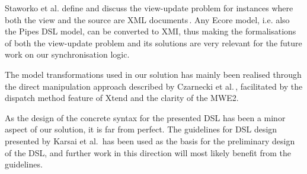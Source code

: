 Staworko et al. define and discuss the view-update problem for instances where both the view and the source are XML documents\,\cite{staworko10}. Any Ecore model, i.e. also the Pipes DSL model, can be converted to XMI, thus making the formalisations of both the view-update problem and its solutions are very relevant for the future work on our synchronisation logic.

The model transformations used in our solution has mainly been realised through the direct manipulation approach described by Czarnecki et al.\,\cite{czarnecki06}, facilitated by the dispatch method feature of Xtend and the clarity of the MWE2.

As the design of the concrete syntax for the presented DSL has been a minor aspect of our solution, it is far from perfect. The guidelines for DSL design presented by Karsai et al.\,\cite{karsai09} has been used as the basis for the preliminary design of the DSL, and further work in this direction will most likely benefit from the guidelines.



